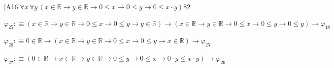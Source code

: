 \begin{fullproof}{[A16]}{$\forall x\,\forall y\,(x \in \mathbb{R} \to y \in \mathbb{R} \to 0 \leq x \to 0 \leq y \to 0 \leq x \cdot y)$}{82}
\begin{abbrevlist}
\item $\varphi_{25} :\equiv (x \in \mathbb{R} \to y \in \mathbb{R} \to 0 \leq x \to 0 \leq y \to y \in \mathbb{R}) \to (x \in \mathbb{R} \to y \in \mathbb{R} \to 0 \leq x \to 0 \leq y \to 0 \leq y) \to \varphi_{18}$
\item $\varphi_{26} :\equiv 0 \in \mathbb{R} \to (x \in \mathbb{R} \to y \in \mathbb{R} \to 0 \leq x \to 0 \leq y \to x \in \mathbb{R}) \to \varphi_{25}$
\item $\varphi_{27} :\equiv (0 \in \mathbb{R} \to x \in \mathbb{R} \to y \in \mathbb{R} \to 0 \leq y \to 0 \leq x \to 0 \cdot y \leq x \cdot y) \to \varphi_{26}$
\end{abbrevlist}
\end{fullproof}
